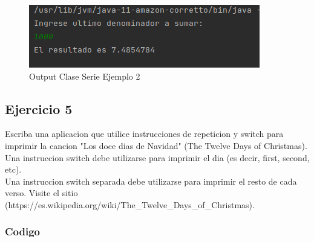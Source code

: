 \documentclass{article}
\begin{document}
\begin{figure}[h]
	\centering
	\includegraphics[scale = 1]{images/serie2.png}
	\caption{Output Clase Serie Ejemplo 2}
\end{figure}
\newpage

\subsection{Ejercicio 5}

Escriba una aplicacion que utilice instrucciones de repeticion y switch para imprimir la cancion "Los doce dias de Navidad" (The Twelve Days of Christmas). Una instruccion switch debe utilizarse para imprimir el dia (es decir, first, second, etc).\\

Una instruccion switch separada debe utilizarse para imprimir el resto de cada verso. Visite el sitio (https://es.wikipedia.org/wiki/The\_Twelve\_Days\_of\_Christmas).

\subsubsection{Codigo}
\end{document}
